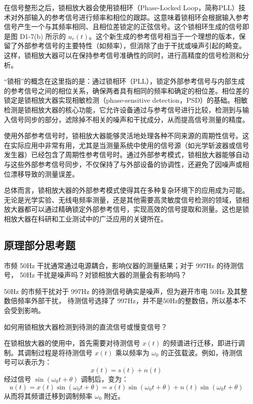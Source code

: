 \documentclass[dvipsnames, svgnames,a4paper,11pt]{article}
\begin{document}
在信号整形之后，锁相放大器会使用锁相环（Phase-Locked Loop，简称PLL）技术对外部输入的参考信号进行频率和相位的跟踪。这意味着锁相环会根据输入参考信号产生一个与其频率相同、且相位差锁定的正弦信号。这个锁相环生成的信号即是图 D1-7(b) 所示的 \( u_r(t) \)。这个新生成的参考信号相当于一个理想的版本，保留了外部参考信号的主要特性（如频率），但消除了由于干扰或噪声引起的畸变。这样，锁相放大器可以在保持参考信号准确性的同时，进行高精度的信号检测和分析。

“锁相”的概念在这里指的是：通过锁相环（PLL），锁定外部参考信号与内部生成的参考信号之间的相位关系，确保两者具有相同的频率和确定的相位差。相位差的锁定是锁相放大器实现相敏检测（phase-sensitive detection，PSD）的基础。相敏检测是锁相放大器的核心功能，它允许设备通过与参考信号进行比较，检测到与输入信号同步的部分，滤除掉不相关的噪声和干扰成分，从而提高信号测量的精度。

使用外部参考信号时，锁相放大器能够灵活地处理各种不同来源的周期性信号。这在实际应用中非常有用，尤其是当测量系统中使用的信号源（如光学斩波器或信号发生器）已经包含了周期性参考信号时。通过外部参考模式，锁相放大器能够自动与这些外部参考信号同步，不仅保持了与外部设备的协调性，还避免了因噪声或相位漂移导致的测量误差。

总体而言，锁相放大器的外部参考模式使得其在多种复杂环境下的应用成为可能。无论是光学实验、无线电频率测量，还是其他需要高灵敏度信号检测的领域，锁相放大器都可以通过精确锁定外部参考信号，实现高效的信号提取和测量。这也是锁相放大器在科研和工业测试中的广泛应用的关键所在。

	\subsection{原理部分思考题}
	
	\begin{question}
		市频 50Hz 干扰通常通过电源耦合，影响仪器的测量结果；对于 997Hz 的待测信号，
50Hz 干扰是噪声吗？对锁相放大器的测量会有影响吗？
	\end{question}
	50Hz 的市频干扰对于 997Hz 的待测信号确实是噪声，但为避开市电 50Hz 及其整数倍频率外部干扰，
待测信号选择了 997Hz，并不是50Hz的整数倍，所以基本不会受到影响。
	\begin{question}
		如何用锁相放大器检测到待测的直流信号或慢变信号？
	\end{question}
	在锁相放大器的使用中，首先需要对待测信号 \(x(t)\) 的频谱进行迁移，即进行调制。其调制过程是将待测信号 \(x(t)\) 乘以频率为 \(\omega_0\) 的正弦载波。例如，待测信号可以表示为：
\[
x(t) = s(t) + n(t)
\]
经过信号 \(\sin(\omega_0 t + \theta)\) 调制后，变为：
\[
u(t) = x(t) \sin(\omega_0 t + \theta) = s(t) \sin(\omega_0 t + \theta) + n(t) \sin(\omega_0 t + \theta)
\]
从而将其频谱迁移到调制频率 \(\omega_0\) 附近。
\end{document}
